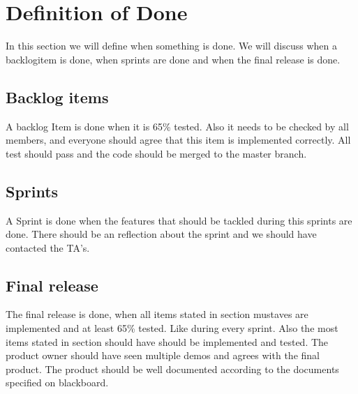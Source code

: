 \newpage
\section{Definition of Done}
In this section we will define when something is done. We will discuss when a backlogitem is done, when sprints are done and when the final release is done.
\subsection{Backlog items}
A backlog Item is done when it is 65\% tested. Also it needs to be checked by all members, and everyone should agree that this item is implemented correctly. All test should pass and the code should be merged to the master branch.
\subsection{Sprints}
A Sprint is done when the features that should be tackled during this sprints are done. There should be an reflection about the sprint and we should have contacted the TA's.
\subsection{Final release}
The final release is done, when all items stated in section mustaves are implemented and at least 65\% tested. Like during every sprint. Also the most items stated in section should have should be implemented and tested. \newline
The product owner should have seen multiple demos and agrees with the final product. \newline
The product should be well documented according to the documents specified on blackboard.